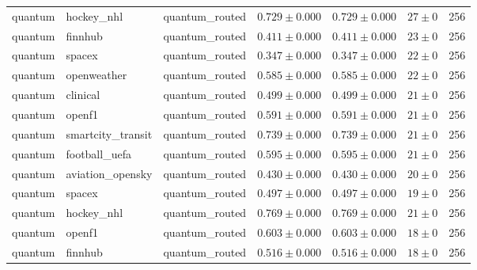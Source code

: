 \begin{table}[htbp]
\begin{tabular}{l l l r r r r}
quantum & hockey\_nhl & quantum\_routed & $0.729\pm0.000$ & $0.729\pm0.000$ & $27\pm0$ & 256 \\
quantum & finnhub & quantum\_routed & $0.411\pm0.000$ & $0.411\pm0.000$ & $23\pm0$ & 256 \\
quantum & spacex & quantum\_routed & $0.347\pm0.000$ & $0.347\pm0.000$ & $22\pm0$ & 256 \\
quantum & openweather & quantum\_routed & $0.585\pm0.000$ & $0.585\pm0.000$ & $22\pm0$ & 256 \\
quantum & clinical & quantum\_routed & $0.499\pm0.000$ & $0.499\pm0.000$ & $21\pm0$ & 256 \\
quantum & openf1 & quantum\_routed & $0.591\pm0.000$ & $0.591\pm0.000$ & $21\pm0$ & 256 \\
quantum & smartcity\_transit & quantum\_routed & $0.739\pm0.000$ & $0.739\pm0.000$ & $21\pm0$ & 256 \\
quantum & football\_uefa & quantum\_routed & $0.595\pm0.000$ & $0.595\pm0.000$ & $21\pm0$ & 256 \\
quantum & aviation\_opensky & quantum\_routed & $0.430\pm0.000$ & $0.430\pm0.000$ & $20\pm0$ & 256 \\
quantum & spacex & quantum\_routed & $0.497\pm0.000$ & $0.497\pm0.000$ & $19\pm0$ & 256 \\
quantum & hockey\_nhl & quantum\_routed & $0.769\pm0.000$ & $0.769\pm0.000$ & $21\pm0$ & 256 \\
quantum & openf1 & quantum\_routed & $0.603\pm0.000$ & $0.603\pm0.000$ & $18\pm0$ & 256 \\
quantum & finnhub & quantum\_routed & $0.516\pm0.000$ & $0.516\pm0.000$ & $18\pm0$ & 256 \\
\hline
\end{tabular}
\end{table}
